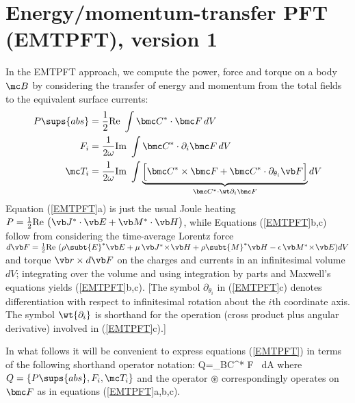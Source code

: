 \newpage
\section{Energy/momentum-transfer PFT (EMTPFT), version 1}

In the EMTPFT approach, we compute the power, force and torque
on a body $\mc B$ by considering the transfer of energy and
momentum from the total fields to the equivalent surface currents:
\begin{subequations}
\begin{align}
 P\sups{abs}&=\frac{1}{2}\text{Re }\int \bmc C^* \cdot \bmc F \, dV 
\\
 F_i&=\frac{1}{2\omega}\text{Im }\int \bmc C^* \cdot \partial_i \bmc F \, dV
\\
 \mc T_i
 &=\frac{1}{2\omega}\text{Im }\int
 \underbrace{
 \Big[   \bmc C^* \times \bmc F 
       + \bmc C^* \cdot \partial_{\theta_i} \vb F\Big]
            }_{\bmc C^* \cdot \wt \partial_i \bmc F}dV
\end{align}
\label{EMTPFT}%
\end{subequations}%
Equation (\ref{EMTPFT}a) is just the usual Joule heating
$P=\frac{1}{2}\text{Re } \big(\vb J^*\cdot \vb E + \vb M^* \cdot \vb H\big)$,
while Equations (\ref{EMTPFT}b,c) follow from considering the time-average
Lorentz force 
$d\vb F=\frac{1}{2}\text{Re }
      (\rho\subt{E}^* \vb E + \mu\, \vb J^* \! \times \! \vb H
      +\rho\subt{M}^* \vb H - \epsilon\, \vb M^* \! \times \! \vb E
      )dV
$
and torque $\vb r\times d\vb F$ on the charges and currents
in an infinitesimal volume $dV$; integrating over the
volume and using integration by parts and Maxwell's equations
yields (\ref{EMTPFT}b,c). [The symbol $\partial_{\theta_i}$
in (\ref{EMTPFT}c) denotes differentiation with 
respect to infinitesimal rotation about the $i$th coordinate 
axis. The symbol $\wt{\partial_i}$ is shorthand for the 
operation (cross product plus angular derivative)
involved in (\ref{EMTPFT}c).]

In what follows it will be convenient to express equations
(\ref{EMTPFT}) in terms of the following shorthand operator notation:
{
 Q=\int_{\partial \mc B}\bmc C^* \circledast \bmc F \, dA
}
where $Q=\{P\sups{abs}, F_i, \mc T_i\}$ and
the operator $\circledast$ correspondingly operates on $\bmc F$ as
in equations (\ref{EMTPFT}a,b,c).

